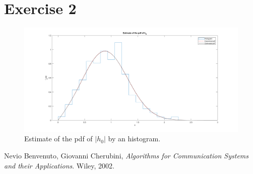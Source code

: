 \documentclass[a4paper,11.5pt]{article}
\begin{document}
\section*{Exercise 2}
\begin{figure}[ht]
	\begin{center}    
		\includegraphics[width=\textwidth]{figs/estimate-pdf.png}
		\caption{Estimate of the pdf of $|h_0|$ by an histogram.}
		\label{fig:hist}
	\end{center}
\end{figure} 

\begin{thebibliography}{15}
	Nevio Benvenuto, Giovanni Cherubini,
	\textit{Algorithms for Communication Systems and their Applications}. 
	Wiley, 2002.
\end{thebibliography}
\end{document}
